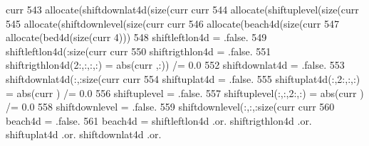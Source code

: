 \begin{DoxyCode}
      curr%
543                 \textcolor{keyword}{allocate}(shiftdownlat4d(\textcolor{keyword}{size}(curr%
      curr%
544                 \textcolor{keyword}{allocate}(shiftuplevel(\textcolor{keyword}{size}(curr%
545                 \textcolor{keyword}{allocate}(shiftdownlevel(\textcolor{keyword}{size}(curr%
      curr%
546                 \textcolor{keyword}{allocate}(beach4d(\textcolor{keyword}{size}(curr%
547                 \textcolor{keyword}{allocate}(bed4d(\textcolor{keyword}{size}(curr%
      4)))
548                 shiftleftlon4d = .false.
549                 shiftleftlon4d(:\textcolor{keyword}{size}(curr%
       curr%
550                 shiftrigthlon4d = .false.
551                 shiftrigthlon4d(2:,:,:,:) = abs(curr%
      ,:)) /= 0.0
552                 shiftdownlat4d = .false.
553                 shiftdownlat4d(:,:\textcolor{keyword}{size}(curr%
       curr%
554                 shiftuplat4d = .false.
555                 shiftuplat4d(:,2:,:,:) = abs(curr%
      ) /= 0.0
556                 shiftuplevel = .false.
557                 shiftuplevel(:,:,2:,:) = abs(curr%
      ) /= 0.0
558                 shiftdownlevel = .false.
559                 shiftdownlevel(:,:,:\textcolor{keyword}{size}(curr%
       curr%
560                 beach4d = .false.
561                 beach4d = shiftleftlon4d .or. shiftrigthlon4d .or. shiftuplat4d .or. shiftdownlat4d .or. 

\end{DoxyCode}
